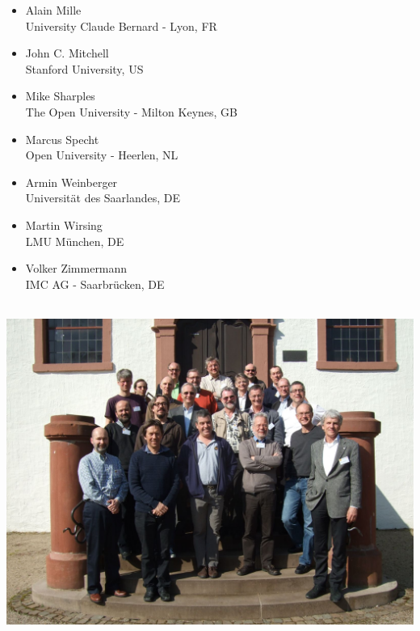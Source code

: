 \begin{minipage}[t]{0.32\linewidth} \footnotesize
\begin{itemize}
\item Alain Mille \\ University Claude Bernard - Lyon, FR
\item John C. Mitchell \\ Stanford University, US
\item Mike Sharples \\ The Open University - Milton Keynes, GB
\item Marcus Specht \\ Open University - Heerlen, NL
\item Armin Weinberger \\ Universität des Saarlandes, DE
\item Martin Wirsing \\ LMU München, DE
\item Volker Zimmermann \\IMC AG - Saarbrücken, DE
\end{itemize}
\end{minipage}
\begin{center}
  \includegraphics[height=11cm]{picture-14112.jpg}
\end{center}


